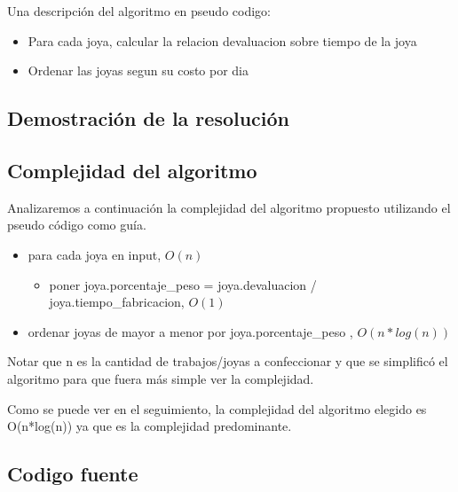Una descripci\'on del algoritmo en pseudo codigo:

\begin{itemize}
\item Para cada joya, calcular la relacion devaluacion sobre tiempo de la joya
\item Ordenar las joyas segun su costo por dia
\end{itemize}

\subsection{Demostraci\'on de la resoluci\'on}



\subsection{Complejidad del algoritmo}

Analizaremos a continuaci\'on la complejidad del algoritmo propuesto utilizando el pseudo c\'odigo como gu\'ia.

\begin{itemize}
\item para cada  joya en input, $O(n)$
\begin{itemize}
\item poner joya.porcentaje\_peso = joya.devaluacion / joya.tiempo\_fabricacion, $O(1)$
\end{itemize}

\item ordenar joyas de mayor a menor por joya.porcentaje\_peso , $O(n*log(n))$
\end{itemize}


Notar que n es la cantidad de trabajos/joyas a confeccionar y que se simplific\'o el algoritmo para que fuera m\'as simple ver la complejidad.

Como se puede ver en el seguimiento, la complejidad del algoritmo elegido es O(n*log(n)) ya que es la complejidad predominante.\\

\newpage
\subsection{Codigo fuente}

